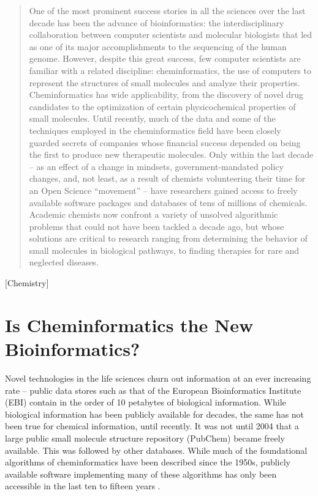 \documentclass{sig-alternate}
\begin{document}
\maketitle
\begin{abstract}
  One of the most prominent success stories in all the sciences over
  the last decade has been the advance of bioinformatics: the
  interdisciplinary collaboration between computer scientists and
  molecular biologists that led as one of its major accomplishments to the
  sequencing of the human genome. However,
  despite this great success, few computer scientists are familiar
  with a related discipline: cheminformatics, the use of computers to
  represent the structures of small molecules and analyze their
  properties.  Cheminformatics has wide applicability, from the
  discovery of novel drug candidates to the optimization of certain
  physicochemical properties of small molecules. Until recently, much
  of the data and some of the techniques employed in the
  cheminformatics field have been closely guarded secrets of companies
  whose financial success depended on being the first to produce
  new therapeutic molecules.  Only within the last decade -- as an
  effect of a change in mindsets, government-mandated policy changes,
  and, not least, as a result of chemists volunteering their time
  for an Open Science ``movement'' -- have researchers gained access to
  freely available software packages and databases of tens of millions
  of chemicals. Academic chemists now confront a variety of unsolved
  algorithmic problems that could not have been tackled a decade ago,
  but whose solutions are critical to research ranging from
  determining the behavior of small molecules in biological pathways,
  to finding therapies for rare and neglected diseases.
\end{abstract}

[Chemistry]

\section{Is Cheminformatics the New \\Bioinformatics?}

Novel technologies in the life sciences churn out information at an
ever increasing rate -- public data stores such as that of the
European Bioinformatics Institute (EBI) contain in the order of 10
petabytes of biological information.  While biological information has
been publicly available for decades, the same has not been true for
chemical information, until recently. It was not until 2004 that a
large public small molecule structure repository (PubChem) became
freely available. This was followed by other databases. While much of
the foundational algorithms of cheminformatics have been described
since the 1950s, publicly available software implementing many of
these algorithms has only been accessible in the last ten to fifteen
years \cite{faulon2010}.
\end{document}
